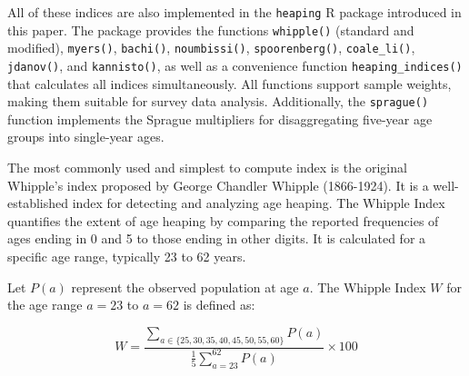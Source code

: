 \documentclass[pdflatex,sn-mathphys-num]{sn-jnl}%
\theoremstyle{thmstyleone}%
\theoremstyle{thmstyletwo}%
\theoremstyle{thmstylethree}%
\begin{document}
All of these indices are also implemented in the \texttt{heaping} R package introduced in this paper. The package provides the functions \texttt{whipple()} (standard and modified), \texttt{myers()}, \texttt{bachi()}, \texttt{noumbissi()}, \texttt{spoorenberg()}, \texttt{coale\_li()}, \texttt{jdanov()}, and \texttt{kannisto()}, as well as a convenience function \texttt{heaping\_indices()} that calculates all indices simultaneously. All functions support sample weights, making them suitable for survey data analysis. Additionally, the \texttt{sprague()} function implements the Sprague multipliers \citep{sprague1880} for disaggregating five-year age groups into single-year ages.

The most commonly used \citep{rasul23} and simplest to compute index is the original Whipple's index
proposed by George Chandler Whipple (1866-1924). It is a well-established index for detecting and analyzing age heaping. 
The Whipple Index quantifies the extent of age heaping by comparing the reported frequencies of ages ending in 0 and 5 to those ending in other digits. It is calculated for a specific age range, typically 23 to 62 years.

Let \( P(a) \) represent the observed population at age \( a \). The Whipple Index \( W \) for the age range \( a = 23 \) to \( a = 62 \) is defined as:

\[
W = \frac{\sum_{a \in \{25,30,35,40,45,50,55,60\}} P(a)}{\frac{1}{5} \sum_{a=23}^{62} P(a)} \times 100
\]
\end{document}
